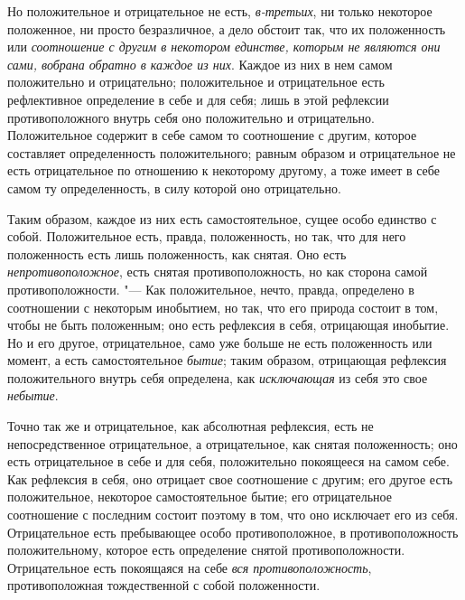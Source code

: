 Но положительное и отрицательное не есть,
{\em в-третьих}, ни только некоторое положенное, ни
просто безразличное, а дело обстоит так, что их положенность или
{\em соотношение с другим в некотором единстве, которым
не являются они сами, вобрана обратно в каждое из них}. Каждое из них в нем
самом положительно и отрицательно; положительное и отрицательное есть
рефлективное определение в себе и для себя; лишь в этой рефлексии
противоположного внутрь себя оно положительно и отрицательно. Положительное
содержит в себе самом то соотношение с другим, которое составляет
определенность положительного; равным образом и отрицательное не есть
отрицательное по отношению к некоторому другому, а тоже имеет в себе самом
ту определенность, в силу которой оно отрицательно.

Таким образом, каждое из них есть самостоятельное, сущее особо единство с
собой. Положительное есть, правда, положенность, но так, что для него
положенность есть лишь положенность, как снятая. Оно есть
{\em непротивоположное}, есть снятая противоположность,
но как сторона самой противоположности. "--- Как положительное, нечто, правда,
определено в соотношении с некоторым инобытием, но так, что его природа
состоит в том, чтобы не быть положенным; оно есть рефлексия в себя,
отрицающая инобытие. Но и его другое, отрицательное, само уже больше не
есть положенность или момент, а есть самостоятельное
{\em бытие}; таким образом, отрицающая рефлексия
положительного внутрь себя определена, как
{\em исключающая} из себя это свое {\em небытие}.

Точно так же и отрицательное, как абсолютная рефлексия, есть не
непосредственное отрицательное, а отрицательное, как снятая положенность;
оно есть отрицательное в себе и для себя, положительно покоящееся на самом
себе. Как рефлексия в себя, оно отрицает свое соотношение с другим; его
другое есть положительное, некоторое самостоятельное бытие; его
отрицательное соотношение с последним состоит поэтому в том, что оно
исключает его из себя. Отрицательное есть пребывающее особо
противоположное, в противоположность положительному, которое есть
определение снятой противоположности. Отрицательное есть покоящаяся на себе
{\em вся противоположность}, противоположная
тождественной с собой положенности.

